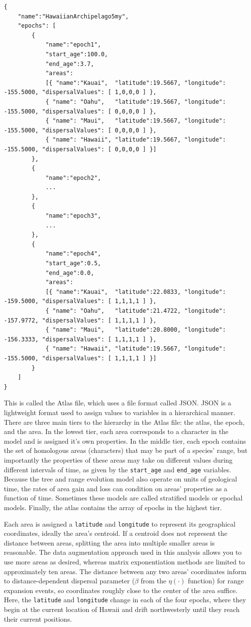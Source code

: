 \begin{framed}
\begin{lstlisting}
{
	"name":"HawaiianArchipelago5my",
	"epochs": [
		{
			"name":"epoch1",
			"start_age":100.0,
			"end_age":3.7,
			"areas":
			[{ "name":"Kauai",  "latitude":19.5667, "longitude": -155.5000, "dispersalValues": [ 1,0,0,0 ] },
			{ "name": "Oahu",   "latitude":19.5667, "longitude": -155.5000, "dispersalValues": [ 0,0,0,0 ] },
			{ "name": "Maui",   "latitude":19.5667, "longitude": -155.5000, "dispersalValues": [ 0,0,0,0 ] },
			{ "name": "Hawaii", "latitude":19.5667, "longitude": -155.5000, "dispersalValues": [ 0,0,0,0 ] }]
		},
		{
			"name":"epoch2",
			...
		},
		{
			"name":"epoch3",
			...
		},
		{
			"name":"epoch4",
			"start_age":0.5,
			"end_age":0.0,
			"areas":
			[{ "name":"Kauai",  "latitude":22.0833, "longitude": -159.5000, "dispersalValues": [ 1,1,1,1 ] },
			{ "name": "Oahu",   "latitude":21.4722, "longitude": -157.9772, "dispersalValues": [ 1,1,1,1 ] },
			{ "name": "Maui",   "latitude":20.8000, "longitude": -156.3333, "dispersalValues": [ 1,1,1,1 ] },
			{ "name": "Hawaii", "latitude":19.5667, "longitude": -155.5000, "dispersalValues": [ 1,1,1,1 ] }]
		}
	]
}
\end{lstlisting}
\end{framed}

This is called the Atlas file, which uses a file format called JSON.
JSON is a lightweight format used to assign values to variables in a hierarchical manner.
There are three main tiers to the hierarchy in the Atlas file: the atlas, the epoch, and the area.
In the lowest tier, each area corresponds to a character in the model and is assigned it's own properties.
In the middle tier, each epoch contains the set of homologous areas (characters) that may be part of a species' range, but importantly the properties of these areas may take on different values during different intervals of time, as given by the {\tt start\_age} and {\tt end\_age} variables.
Because the tree and range evolution model also operate on units of geological time, the rates of area gain and loss can condition on areas' properties as a function of time.
Sometimes these models are called stratified models or epochal models.
Finally, the atlas contains the array of epochs in the highest tier.

Each area is assigned a {\tt latitude} and {\tt longitude} to represent its geographical coordinates, ideally the area's centroid.
If a centroid does not represent the distance between areas, splitting the area into multiple smaller areas is reasonable.
The data augmentation approach used in this analysis allows you to use more areas as desired, whereas matrix exponentiation methods are limited to approximately ten areas.
The distance between any two areas' coordinates inform to distance-dependent dispersal parameter ($\beta$ from the $\eta(\cdot)$ function) for range expansion events, so coordinates roughly close to the center of the area suffice.
Here, the {\tt latitude} and {\tt longitude} change in each of the four epochs, where they begin at the current location of Hawaii and drift northwesterly until they reach their current positions.

